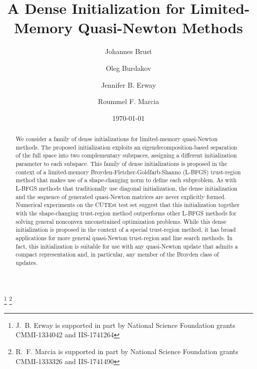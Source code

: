 \documentclass[reqno,12pt]{amsart}
\begin{document}
\title[A Dense Initialization for Limited-Memory Quasi-Newton Methods]
{A Dense Initialization for Limited-Memory Quasi-Newton Methods}



\author[J. Brust]{Johannes Brust}
\address{Applied Mathematics, University of California, Merced, Merced, CA 95343}

\author[O. Burdakov]{Oleg Burdakov}
\address{Department of Mathematics, Link\"{o}ping University, SE-581 83 Link\"{o}ping, Sweden}

\author[J. Erway]{Jennifer B. Erway}
\address{Department of Mathematics, Wake Forest University, Winston-Salem, NC 27109}

\author[R. Marcia]{Roummel F. Marcia}
\address{Applied Mathematics, University of California, Merced, Merced, CA 95343}

\thanks{J.~B. Erway is supported in part by National Science Foundation grants
CMMI-1334042 and IIS-1741264}
\thanks{R.~F. Marcia is supported in part by National Science Foundation grants
CMMI-1333326 and IIS-1741490}

\date{\today}



\begin{abstract}
  We consider a family of dense initializations for
  limited-memory quasi-Newton methods.  
  The proposed initialization %
exploits an eigendecompo\-sition-based separation of the full space
into two complementary subspaces, 
assigning a different initialization parameter to
each subspace. This family of dense
  initializations is proposed in the context of 
  a limited-memory Broyden-Fletcher-Goldfarb-Shanno ({L-BFGS}) 
  trust-region method that makes use of a shape-changing norm to
  define each subproblem. 
As with {L-BFGS} methods that traditionally
  use diagonal initialization, the dense initialization and the
  sequence of generated quasi-Newton matrices are never explicitly
  formed.  Numerical experiments on the CUTEst test set suggest that
  this initialization together with the shape-changing trust-region
  method outperforms other L-BFGS
  methods for solving general nonconvex unconstrained optimization
  problems.  While this dense initialization is proposed in the
  context of a special trust-region method, it has broad applications
  for more general quasi-Newton trust-region and line search methods.
  In fact, this initialization is suitable for use with any
  quasi-Newton update that admits a compact representation and, in
  particular, any member of the Broyden class of updates.
\end{abstract}
\end{document}

